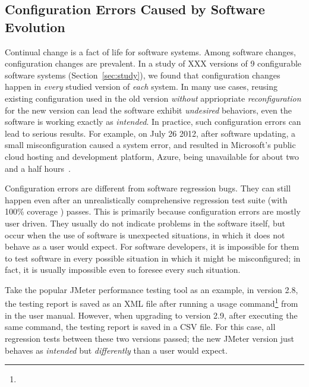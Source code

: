\subsection{Configuration Errors Caused by Software Evolution}
\label{sec:evolerror}

Continual change is a fact of life for software systems.
Among software changes, configuration changes are prevalent.
In a study of XXX versions of 9 configurable software
systems (Section~\ref{sec:study}),
we found that configuration changes happen in \textit{every} studied
version of \textit{each} system. In many use
cases, reusing existing configuration used in the old
version \textit{without} appriopriate
\textit{reconfiguration} for the new
version can lead the software exhibit \textit{undesired} behaviors,
even the software is working exactly as \textit{intended}.
In practice, such configuration errors can lead to serious results.
For example, on July 26 2012, after software updating,
a small misconfiguration caused a system error, and resulted in
Microsoft's public cloud hosting and development platform, Azure,
being unavailable for about two and a half hours~\cite{msdown}.


Configuration errors are different from software regression bugs.
They can still happen even after an unrealistically comprehensive
regression test suite (with 100\% coverage ) passes. This is primarily
because configuration errors are mostly user driven.
They usually do not indicate problems in the software itself, but
occur when the use of software is unexpected
situations, in which it does not behave as a user would expect.
For software developers,
it is impossible for them to test software in every possible
situation in which it might be misconfigured; in fact, it is usually
impossible even to foresee every such situation. 


Take the popular JMeter performance testing tool as an example, 
in version 2.8, the testing report is saved as an XML
file after running a usage command\footnote{} from in the user manual.
However, when upgrading to version 2.9, 
after executing the same command, the testing report is saved
in a CSV file. For this case, all regression tests between
these two versions passed; the new JMeter version
just behaves as \textit{intended} but \textit{differently}
than a user would expect.


